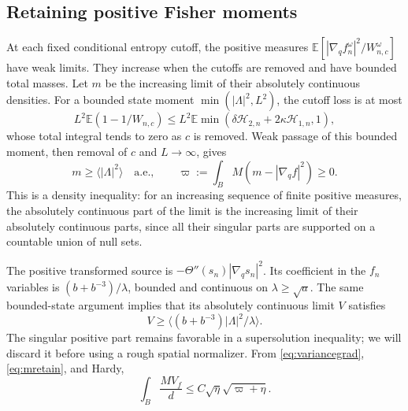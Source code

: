 \documentclass[11pt]{article}
\numberwithin{equation}{section}
\newcommand{\E}{\mathbb E}
\newcommand{\grad}{\nabla}
\newcommand{\pair}[1]{\langle #1\rangle}
\begin{document}
\subsection{Retaining positive Fisher moments}\label{subsec:retention}
At each fixed conditional entropy cutoff, the positive measures
$\E[|\grad_qf_n^\omega|^2/W_{n,c}^\omega]$ have weak limits. They increase
when the cutoffs are removed and have bounded total masses. Let $m$ be the
increasing limit of their absolutely continuous densities. For a bounded
state moment $\min(|\Lambda|^2,L^2)$, the cutoff loss is at most
\[
 L^2\E(1-1/W_{n,c})
 \leq L^2\E\min(\delta\mathcal H_{2,n}+2\kappa\mathcal H_{1,n},1),
\]
whose total integral tends to zero as $c$ is removed. Weak passage of this
bounded moment, then removal of $c$ and $L\to\infty$, gives
\begin{equation}\label{eq:mretain}
 m\geq\pair{|\Lambda|^2}\quad\text{a.e.},\qquad
 \varpi:=\int_BM(m-|\grad_qf|^2)\geq0.
\end{equation}
This is a density inequality: for an increasing sequence of finite positive
measures, the absolutely continuous part of the limit is the increasing limit
of their absolutely continuous parts, since all their singular parts are
supported on a countable union of null sets.

The positive transformed source is
$-\Theta''(s_n)|\grad_qs_n|^2$. Its coefficient in the $f_n$ variables is
$(b+b^{-3})/\lambda$, bounded and continuous on $\lambda\geq\sqrt a$.
The same bounded-state argument implies that its absolutely continuous limit
$V$ satisfies
\begin{equation}\label{eq:Vretain}
 V\geq\pair{(b+b^{-3})|\Lambda|^2/\lambda}.
\end{equation}
The singular positive part remains favorable in a supersolution inequality;
we will discard it before using a rough spatial normalizer.
From \eqref{eq:variancegrad}, \eqref{eq:mretain}, and Hardy,
\begin{equation}\label{eq:varianceHardy}
 \int_B\frac{MV_f}{d}\leq C\sqrt\eta\sqrt{\varpi+\eta}.
\end{equation}
\end{document}

